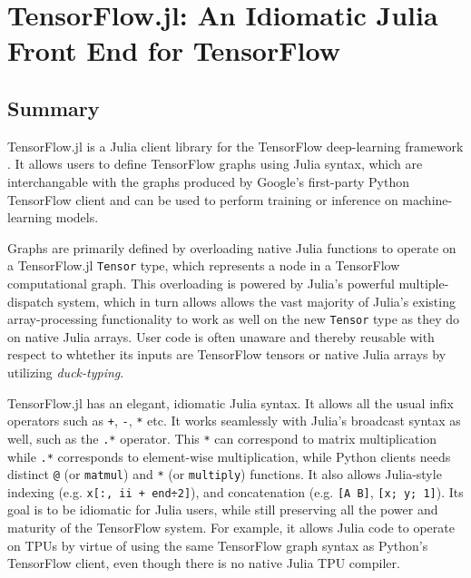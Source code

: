 \documentclass{book}
\begin{document}
\chapter{TensorFlow.jl: An Idiomatic Julia Front End for TensorFlow}

\hypertarget{summary}{%
	\section{Summary}\label{summary}}

TensorFlow.jl is a Julia \citep{Julia} client library for the
TensorFlow deep-learning framework
\citep{tensorflow2015-whitepaper,tensorflow2016}. It allows users to define
TensorFlow graphs using Julia syntax, which are interchangable with the
graphs produced by Google's first-party Python TensorFlow client and can
be used to perform training or inference on machine-learning models.

Graphs are primarily defined by overloading native Julia functions to
operate on a TensorFlow.jl \texttt{Tensor} type, which represents a node
in a TensorFlow computational graph. This overloading is powered by
Julia's powerful multiple-dispatch system, which in turn allows allows
the vast majority of Julia's existing array-processing functionality to
work as well on the new \texttt{Tensor} type as they do on native Julia
arrays. User code is often unaware and thereby reusable with respect to
whtether its inputs are TensorFlow tensors or native Julia arrays by
utilizing \emph{duck-typing}.

TensorFlow.jl has an elegant, idiomatic Julia syntax. It allows all the
usual infix operators such as \texttt{+}, \texttt{-}, \texttt{*} etc. It
works seamlessly with Julia's broadcast syntax as well, such as the
\texttt{.*} operator. This \texttt{*} can correspond to matrix
multiplication while \texttt{.*} corresponds to element-wise
multiplication, while Python clients needs distinct \texttt{@} (or
\texttt{matmul}) and \texttt{*} (or \texttt{multiply}) functions. It
also allows Julia-style indexing (e.g.
\texttt{x{[}:,\ ii\ +\ end÷2{]}}), and concatenation (e.g.
\texttt{{[}A\ B{]}}, \texttt{{[}x;\ y;\ 1{]}}). Its goal is to be
idiomatic for Julia users, while still preserving all the power and
maturity of the TensorFlow system. For example, it allows Julia code to
operate on TPUs by virtue of using the same TensorFlow graph syntax as
Python's TensorFlow client, even though there is no native Julia TPU
compiler.
\end{document}
